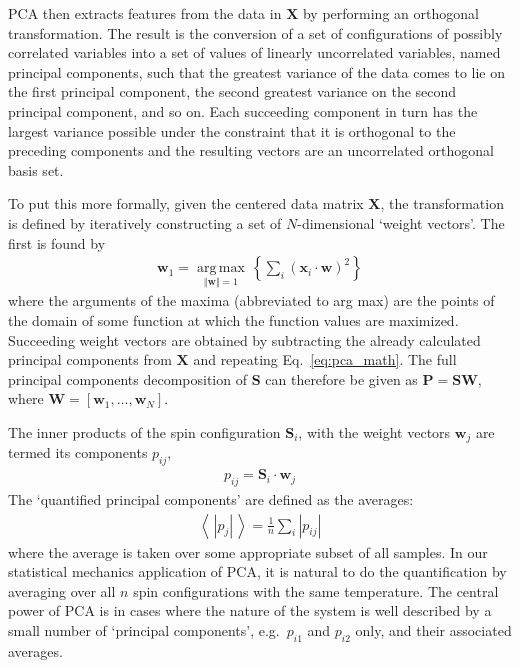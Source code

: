 \documentclass[pra,letterpaper,10pt,twocolumn]{revtex4}
\begin{document}
PCA then extracts features from the data in $\mathbf{X}$ by performing
an orthogonal transformation.  The result is the conversion of a set of
configurations of possibly correlated variables into a set of values of
linearly uncorrelated variables, named principal components, such that
the greatest variance of the data comes to lie on the first principal
component, the second greatest variance on the second principal
component, and so on\cite{Wikipedia}. Each succeeding component in turn
has the largest variance possible under the constraint that it is
orthogonal to the preceding components and the resulting vectors are an
uncorrelated orthogonal basis set. 

To put this more formally,
given the centered data matrix $\mathbf{X}$, the
transformation is defined by iteratively constructing
a set of $N$-dimensional `weight vectors'.
The first is found by
\begin{align}
{\mathbf  {w}}_{{1}}={\underset  {\Vert {\mathbf  {w}}\Vert
=1}{\operatorname {\arg \,max}}}\,\left\{\sum
_{i}\left(\mathbf{x}_i\cdot {\mathbf  {w}}\right)^{2}\right\}
\label{eq:pca_math}
\end{align}
where the arguments of the maxima (abbreviated to arg max) are the points of the domain of some function at which the function values are maximized. 
Succeeding weight vectors are obtained by subtracting the already
calculated principal components from $\mathbf{X}$ and repeating
Eq.~\ref{eq:pca_math}. 
The full principal components decomposition of
$\mathbf{S}$ can therefore be given as $\mathbf{P} = \mathbf{S}
\mathbf{W}$, where $\mathbf{W}=[{\mathbf{w}}_{1}, \dots, {\mathbf
{w}}_{N}]$. 

The inner products of the spin configuration $\mathbf{S}_i$, 
with the weight vectors $\mathbf{w}_j$ are termed its components $p_{ij}$,
\begin{align}
p_{ij}=\mathbf{S}_i \cdot \mathbf{w}_j
\label{eq:pca_math_3}
\end{align}
The `quantified principal components' are defined as the averages: 
\begin{align}
\left\langle \, |p_{j}|  \, \right\rangle=\frac{1}{n}\sum_i |p_{ij}|
\label{eq:pca_math_4}
\end{align}
where the average is taken over some appropriate subset of all
samples.  In our statistical mechanics application of PCA, it is natural
to do the quantification by averaging over all $n$ spin configurations with
the same temperature.  The central power of PCA is in cases where the
nature of the system is well described by a small number of `principal
components', e.g.~$p_{i1}$ and $p_{i2}$ only, and their associated
averages.
\end{document}
